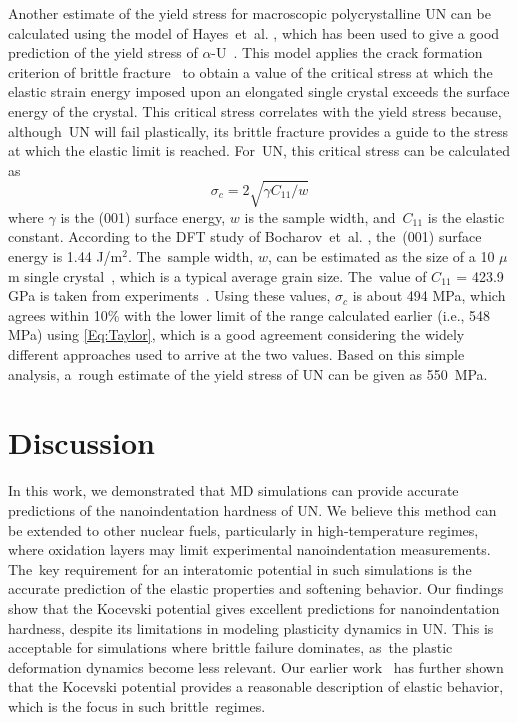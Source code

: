 \documentclass[applsci,article,accept,pdftex,moreauthors]{Definitions/mdpi}
\newcommand{\?}{\stackrel{?}{=}}
\begin{document}
Another estimate of the yield stress for macroscopic polycrystalline UN can be calculated using the model of Hayes~et~al. \cite{Hayes2004}, which has been used to give a good prediction of the yield stress of $\alpha$-U~\cite{Taylor2008}. This model applies the crack formation criterion of brittle fracture~\cite{Murty2013} to obtain a value of the critical stress at which the elastic strain energy imposed upon an elongated single crystal exceeds the surface energy of the crystal. This critical stress correlates with the yield stress because, although~UN will fail plastically, its brittle fracture provides a guide to the stress at which the elastic limit is reached. For~UN, this critical stress can be calculated as~\cite{Hayes2004, Taylor2008}
\begin{equation}
\sigma_c = 2 \sqrt{\gamma C_{11} / w} 
\end{equation}
where $\gamma$ is the (001) surface energy, $w$ is the sample width, and~$C_{11}$ is the elastic constant. According to the DFT study of Bocharov~et~al. \cite{Bocharov2013}, the~(001) surface energy is 1.44 J/m$^2$. The~sample width, $w$, can be estimated as the size of a 10 $\mu$m single crystal~\cite{Hayes2004, Taylor2008}, which is a typical average grain size. The~value of $C_{11}$ = 423.9 GPa is taken from experiments~\cite{Salleh1986}. Using these values, $\sigma_c$ is about 494 MPa, which agrees within 10\% with the lower limit of the range calculated earlier (i.e., 548 MPa) using \cref{Eq:Taylor}, which is a good agreement considering the widely different approaches used to arrive at the two values. Based on this simple analysis, a~rough estimate of the yield stress of UN can be given as 550~MPa.

\section{Discussion}

In this work, we demonstrated that MD simulations can provide accurate predictions of the nanoindentation hardness of UN. We believe this method can be extended to other nuclear fuels, particularly in high-temperature regimes, where oxidation layers may limit experimental nanoindentation measurements. The~key requirement for an interatomic potential in such simulations is the accurate prediction of the elastic properties and softening behavior. Our findings show that the Kocevski potential gives excellent predictions for nanoindentation hardness, despite its limitations in modeling plasticity dynamics in UN. This is acceptable for simulations where brittle failure dominates, as~the plastic deformation dynamics become less relevant. Our earlier work~\cite{AbdulHameed2024} has further shown that the Kocevski potential provides a reasonable description of elastic behavior, which is the focus in such brittle~regimes.
\end{document}
